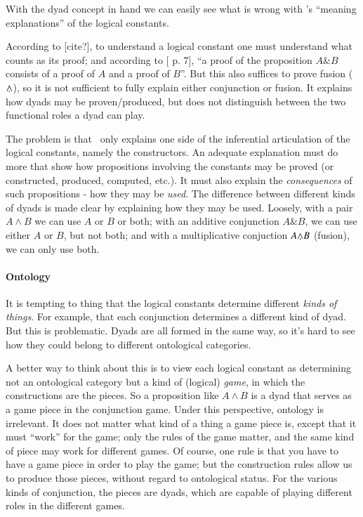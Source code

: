 \documentclass{article}
\begin{document}
With the dyad concept in hand we can easily see what is wrong with
\ML's ``meaning explanations'' of the logical constants.

According to [cite?], to understand a logical constant one must
understand what counts as its proof; and according to
[\parencite{martin1984intuitionistic} p. 7], ``a proof of the proposition
\(A\&B\) consists of a proof of \(A\) and a proof of \(B\)''. But this
also suffices to prove fusion (\(\fusion\)), so it is not sufficient
to fully explain either conjunction or fusion. It explains how dyads
may be proven/produced, but does not distinguish between the two functional
roles a dyad can play.

The problem is that \ML\ only explains one side of the inferential
articulation of the logical constants, namely the constructors. An
adequate explanation must do more that show how propositions involving
the constants may be proved (or constructed, produced, computed,
etc.). It must also explain the \textit{consequences} of such
propositions - how they may be \textit{used}. The difference between
different kinds of dyads is made clear by explaining how they may be
used. Loosely, with a pair \(A\land B\) we can use \(A\) or \(B\) or
both; with an additive conjunction \(A\&B\), we can use either \(A\)
or \(B\), but not both; and with a multiplicative conjuction \(A\fusion
B\) (fusion), we can only use both.

\paragraph{Ontology}

It is tempting to thing that the logical constants determine different
\textit{kinds of things}. For example, that each conjunction
determines a different kind of dyad. But this is problematic. Dyads
are all formed in the same way, so it's hard to see how they could
belong to different ontological categories.

A better way to think about this is to view each logical constant as
determining not an ontological category but a kind of (logical)
\textit{game}, in which the constructions are the pieces. So a
proposition like \(A\land B\) is a dyad that serves as a game piece in
the conjunction game. Under this perspective, ontology is irrelevant.
It does not matter what kind of a thing a game piece is, except that
it must ``work'' for the game; only the rules of the game matter, and
the same kind of piece may work for different games. Of course, one
rule is that you have to have a game piece in order to play the game;
but the construction rules allow us to produce those pieces, without
regard to ontological status. For the various kinds of conjunction,
the pieces are dyads, which are capable of playing different roles in
the different games.
\end{document}

